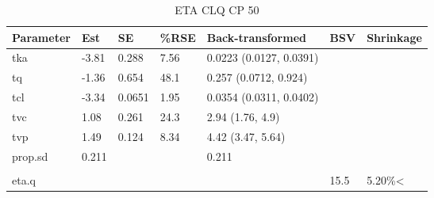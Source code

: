 \begin{table}
\centering\centering
\caption{ETA CLQ CP 50}
\centering
\fontsize{8}{10}\selectfont
\begin{tabular}[t]{lllllll}
\toprule
\textbf{Parameter} & \textbf{Est} & \textbf{SE} & \textbf{\%RSE} & \textbf{Back-transformed} & \textbf{BSV} & \textbf{Shrinkage}\\
\midrule
tka & -3.81 & 0.288 & 7.56 & 0.0223 (0.0127, 0.0391) &  & \\
\midrule
tq & -1.36 & 0.654 & 48.1 & 0.257 (0.0712, 0.924) &  & \\
\midrule
tcl & -3.34 & 0.0651 & 1.95 & 0.0354 (0.0311, 0.0402) &  & \\
\midrule
tvc & 1.08 & 0.261 & 24.3 & 2.94 (1.76, 4.9) &  & \\
\midrule
tvp & 1.49 & 0.124 & 8.34 & 4.42 (3.47, 5.64) &  & \\
\midrule
prop.sd & 0.211 &  &  & 0.211 &  & \\
\midrule\\
eta.q &  &  &  &  & 15.5 & 5.20\%<\\
\bottomrule
\end{tabular}
\end{table}
